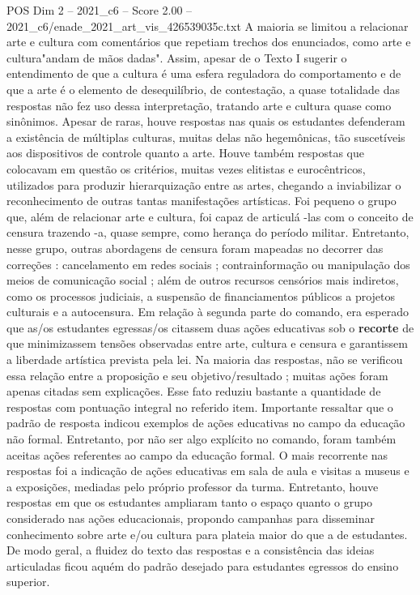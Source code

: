 \begin{textsample}{POS Dim 2 – 2021\_c6 – Score 2.00 – 2021\_c6/enade\_2021\_art\_vis\_426539035c.txt}
A maioria se limitou a relacionar arte e cultura com comentários que repetiam trechos dos enunciados, como arte e cultura"andam de mãos dadas".
Assim, apesar de o Texto I sugerir o entendimento de que a cultura é uma esfera reguladora do comportamento e de que a arte é o elemento de desequilíbrio, de contestação, a quase totalidade das respostas não fez uso dessa interpretação, tratando arte e cultura quase como sinônimos.
Apesar de raras, houve respostas nas quais os estudantes defenderam a existência de múltiplas culturas, muitas delas não hegemônicas, tão suscetíveis aos dispositivos de controle quanto a arte.
Houve também respostas que colocavam em questão os critérios, muitas vezes elitistas e eurocêntricos, utilizados para produzir hierarquização entre as artes, chegando a inviabilizar o reconhecimento de outras tantas manifestações artísticas.
Foi pequeno o grupo que, além de relacionar arte e cultura, foi capaz de articulá -las com o conceito de censura trazendo -a, quase sempre, como herança do período militar.
Entretanto, nesse grupo, outras abordagens de censura foram mapeadas no decorrer das correções : cancelamento em redes sociais ; contrainformação ou manipulação dos meios de comunicação social ; além de outros recursos censórios mais indiretos, como os processos judiciais, a suspensão de financiamentos públicos a projetos culturais e a autocensura.
Em relação à segunda parte do comando, era esperado que as/os estudantes egressas/os citassem duas ações educativas sob o \textbf{recorte} de que minimizassem tensões observadas entre arte, cultura e censura e garantissem a liberdade artística prevista pela lei.
Na maioria das respostas, não se verificou essa relação entre a proposição e seu objetivo/resultado ; muitas ações foram apenas citadas sem explicações.
Esse fato reduziu bastante a quantidade de respostas com pontuação integral no referido item.
Importante ressaltar que o padrão de resposta indicou exemplos de ações educativas no campo da educação não formal.
Entretanto, por não ser algo explícito no comando, foram também aceitas ações referentes ao campo da educação formal.
O mais recorrente nas respostas foi a indicação de ações educativas em sala de aula e visitas a museus e a exposições, mediadas pelo próprio professor da turma.
Entretanto, houve respostas em que os estudantes ampliaram tanto o espaço quanto o grupo considerado nas ações educacionais, propondo campanhas para disseminar conhecimento sobre arte e/ou cultura para plateia maior do que a de estudantes.
De modo geral, a fluidez do texto das respostas e a consistência das ideias articuladas ficou aquém do padrão desejado para estudantes egressos do ensino superior.

\end{textsample}
